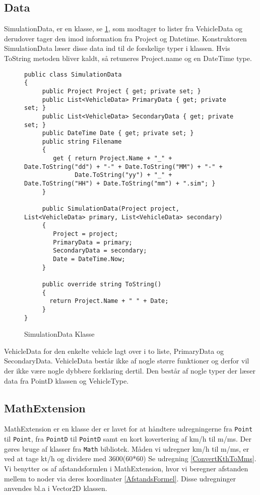\subsection{Data}
SimulationData, er en klasse, se \ref{SimulatonDataClass}, som modtager to lister fra VehicleData og derudover tager den imod information fra Project og Datetime. Konstruktoren SimulationData læser disse data ind til de forskelige typer i klassen. Hvis ToString metoden bliver kaldt, så retuneres Project.name og en DateTime type.

\begin{figure}[H]
\begin{lstlisting}
public class SimulationData
{
     public Project Project { get; private set; }
     public List<VehicleData> PrimaryData { get; private set; }
     public List<VehicleData> SecondaryData { get; private set; }
     public DateTime Date { get; private set; }
     public string Filename
     {
        get { return Project.Name + "_" + Date.ToString("dd") + "-" + Date.ToString("MM") + "-" + 
              Date.ToString("yy") + "_" + Date.ToString("HH") + Date.ToString("mm") + ".sim"; }
     }
        
     public SimulationData(Project project, List<VehicleData> primary, List<VehicleData> secondary)
     {
        Project = project;
        PrimaryData = primary;
        SecondaryData = secondary;
        Date = DateTime.Now;
     }

     public override string ToString()
     {
       return Project.Name + " " + Date;
     }
}
\end{lstlisting}
\caption{SimulationData Klasse} \label{SimulatonDataClass}
\end{figure}

VehicleData for den enkelte vehicle lagt over i to liste, PrimaryData og SecondaryData. VehicleData består ikke af nogle større funktioner og derfor vil der ikke være nogle dybbere forklaring dertil. Den består af nogle typer der læser data fra PointD klassen og VehicleType.

\subsection{MathExtension}
MathExtension er en klasse der er lavet for at håndtere udregningerne fra \texttt{Point} til \texttt{Point}, fra \texttt{PointD} til \texttt{PointD} samt en kort kovertering af km/h til m/ms. Der gøres bruge af klasser fra \texttt{Math} bibliotek. Måden vi udregner km/h til m/ms, er ved at tage kt/h og dividere med 3600(60*60) Se udregning \ref{ConvertKthToMms}. Vi benytter os af afstandsformlen i MathExtension, hvor vi beregner afstanden mellem to noder via deres koordinater \ref{AfstandsFormel}. Disse udregninger anvendes bl.a i Vector2D klassen.

